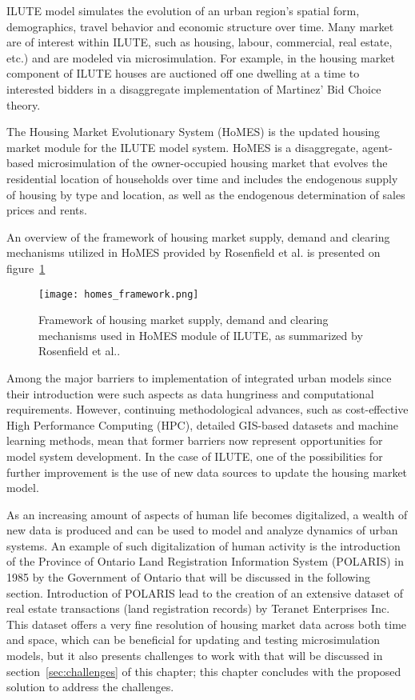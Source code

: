 ILUTE model simulates the evolution of an urban region's spatial form, demographics, travel behavior and economic structure over time.
Many market are of interest within ILUTE, such as housing, labour, commercial, real estate, etc.) and are modeled via microsimulation.
For example, in the housing market component of ILUTE houses are auctioned off one dwelling at a time to interested bidders in a disaggregate implementation of Martinez' Bid Choice theory\cite{Martinez1992}.

The Housing Market Evolutionary System (HoMES) is the updated housing market module for the ILUTE model system.
HoMES is a disaggregate, agent-based microsimulation of the owner-occupied housing market that evolves the residential location of households over time and includes the endogenous supply of housing by type and location, as well as the endogenous determination of sales prices and rents.

An overview of the framework of housing market supply, demand and clearing mechanisms utilized in HoMES provided by Rosenfield et al.\cite{Rosenfield2013} is presented on figure~\ref{fig:homes_framework}

\begin{figure}[hbt!]
    \centering
    \texttt{[image: homes\_framework.png]}
    \caption{Framework of housing market supply, demand and clearing mechanisms used in HoMES module of ILUTE, as summarized by Rosenfield et al.\cite{Rosenfield2013}.}
    \label{fig:homes_framework}
\end{figure}

Among the major barriers to implementation of integrated urban models since their introduction were such aspects as data hungriness and computational requirements\cite{Miller1998}.
However, continuing methodological advances, such as cost-effective High Performance Computing (HPC), detailed GIS-based datasets and machine learning methods, mean that former barriers now represent opportunities for model system development.
In the case of ILUTE, one of the possibilities for further improvement is the use of new data sources to update the housing market model.

As an increasing amount of aspects of human life becomes digitalized, a wealth of new data is produced and can be used to model and analyze dynamics of urban systems\cite{Arribas-Bel2014, Chen2016}.
An example of such digitalization of human activity is the introduction of the Province of Ontario Land Registration Information System (POLARIS) in 1985 by the Government of Ontario\cite{TeranetEnterprisesInc.} that will be discussed in the following section.
Introduction of POLARIS lead to the creation of an extensive dataset of real estate transactions (land registration records) by Teranet Enterprises Inc.
This dataset offers a very fine resolution of housing market data across both time and space, which can be beneficial for updating and testing microsimulation models, but it also presents challenges to work with that will be discussed in section~\ref{sec:challenges} of this chapter;
this chapter concludes with the proposed solution to address the challenges.


